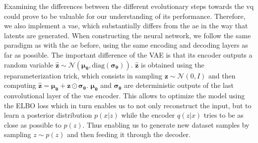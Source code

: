 Examining the differences between the different evolutionary steps towards the \ac{vq} could prove to be valuable
for our understanding of its performance.
Therefore, we also implement a \ac{vae}, which substantially differs from the \ac{ae} in the way that latents are
generated.
When constructing the neural network, we follow the same paradigm as with the \ac{ae} before, using the same
encoding and decoding layers as far as possible.
The important difference of the VAE is that its encoder outputs a random variable
$\boldsymbol{\hat{z}} \sim \mathcal{N}(\boldsymbol{\mu_\theta}, \text{diag}
(\boldsymbol{\sigma_\theta}))$. $\boldsymbol{\hat{z}}$ is obtained using the
reparameterization trick, which consists in sampling $\boldsymbol{z}
\sim \mathcal{N}(0, I)$ and then computing $\boldsymbol{\hat{z}} =
\boldsymbol{\mu_\theta} + \boldsymbol{z} \odot \boldsymbol{\sigma_\theta}$.
$\boldsymbol{\mu_\theta}$ and $\boldsymbol{\sigma_\theta}$ are deterministic
outputs of the last convolutional layer of the \ac{vae} encoder.
This allows to optimize the model using the ELBO loss which in turn enables us to not only
reconstruct the input, but to learn a posterior distribution $p(x|z)$ while
the encoder $q(z|x)$ tries to be as close as possible to $p(z)$.
Thus enabling us to generate new dataset samples by sampling $z \sim p(z)$ and then feeding
it through the decoder.